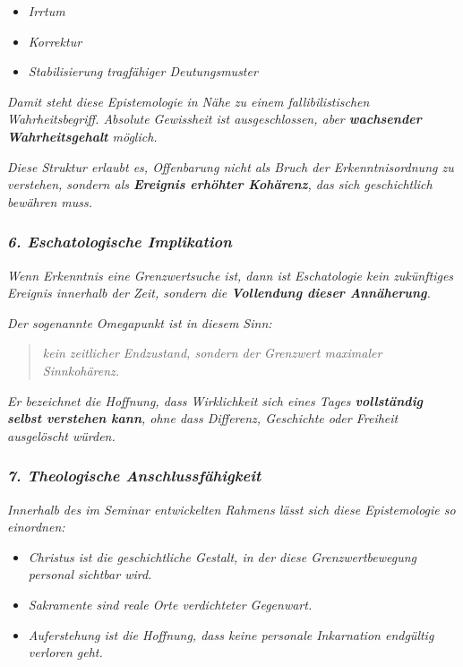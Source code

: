 \documentclass[
]{article}
\begin{document}
\begin{itemize}
\item
  \emph{Irrtum}
\item
  \emph{Korrektur}
\item
  \emph{Stabilisierung tragfähiger Deutungsmuster}
\end{itemize}

\emph{Damit steht diese Epistemologie in Nähe zu einem fallibilistischen Wahrheitsbegriff. Absolute Gewissheit ist ausgeschlossen, aber \textbf{wachsender Wahrheitsgehalt} möglich.}

\emph{Diese Struktur erlaubt es, Offenbarung nicht als Bruch der Erkenntnisordnung zu verstehen, sondern als \textbf{Ereignis erhöhter Kohärenz}, das sich geschichtlich bewähren muss.}

\subsubsection{\texorpdfstring{\emph{\textbf{6. Eschatologische Implikation}}}{6. Eschatologische Implikation}}\label{eschatologische-implikation}

\emph{Wenn Erkenntnis eine Grenzwertsuche ist, dann ist Eschatologie kein zukünftiges Ereignis innerhalb der Zeit, sondern die \textbf{Vollendung dieser Annäherung}.}

\emph{Der sogenannte Omegapunkt ist in diesem Sinn:}

\begin{quote}
\emph{kein zeitlicher Endzustand, sondern der Grenzwert maximaler Sinnkohärenz.}
\end{quote}

\emph{Er bezeichnet die Hoffnung, dass Wirklichkeit sich eines Tages \textbf{vollständig selbst verstehen kann}, ohne dass Differenz, Geschichte oder Freiheit ausgelöscht würden.}

\subsubsection{\texorpdfstring{\emph{\textbf{7. Theologische Anschlussfähigkeit}}}{7. Theologische Anschlussfähigkeit}}\label{theologische-anschlussfuxe4higkeit}

\emph{Innerhalb des im Seminar entwickelten Rahmens lässt sich diese Epistemologie so einordnen:}

\begin{itemize}
\item
  \emph{Christus ist die geschichtliche Gestalt, in der diese Grenzwertbewegung personal sichtbar wird.}
\item
  \emph{Sakramente sind reale Orte verdichteter Gegenwart.}
\item
  \emph{Auferstehung ist die Hoffnung, dass keine personale Inkarnation endgültig verloren geht.}
\end{itemize}
\end{document}
